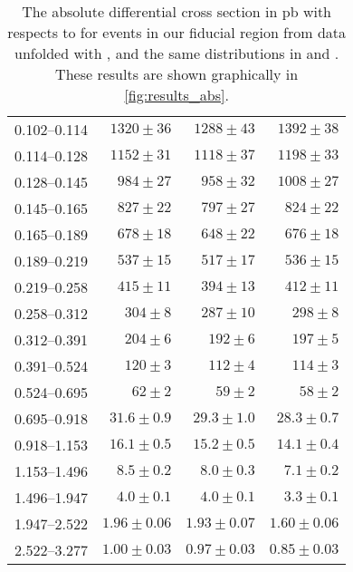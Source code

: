 \begin{table}
\begin{center}
\begin{tabular}{@{}l r r r@{}}
            0.102--0.114  &  $1320  \pm  36$    &  $1288  \pm  43$    &  $1392  \pm  38$    \\
            0.114--0.128  &  $1152  \pm  31$    &  $1118  \pm  37$    &  $1198  \pm  33$    \\
            0.128--0.145  &  $984   \pm  27$    &  $958   \pm  32$    &  $1008  \pm  27$    \\
            0.145--0.165  &  $827   \pm  22$    &  $797   \pm  27$    &  $824   \pm  22$    \\
            0.165--0.189  &  $678   \pm  18$    &  $648   \pm  22$    &  $676   \pm  18$    \\
            0.189--0.219  &  $537   \pm  15$    &  $517   \pm  17$    &  $536   \pm  15$    \\
            0.219--0.258  &  $415   \pm  11$    &  $394   \pm  13$    &  $412   \pm  11$    \\
            0.258--0.312  &  $304   \pm  8$     &  $287   \pm  10$    &  $298   \pm  8$     \\
            0.312--0.391  &  $204   \pm  6$     &  $192   \pm  6$     &  $197   \pm  5$     \\
            0.391--0.524  &  $120   \pm  3$     &  $112   \pm  4$     &  $114   \pm  3$     \\
            0.524--0.695  &  $62    \pm  2$     &  $59    \pm  2$     &  $58    \pm  2$     \\
            0.695--0.918  &  $31.6  \pm  0.9$   &  $29.3  \pm  1.0$   &  $28.3  \pm  0.7$   \\
            0.918--1.153  &  $16.1  \pm  0.5$   &  $15.2  \pm  0.5$   &  $14.1  \pm  0.4$   \\
            1.153--1.496  &  $8.5   \pm  0.2$   &  $8.0   \pm  0.3$   &  $7.1   \pm  0.2$   \\
            1.496--1.947  &  $4.0   \pm  0.1$   &  $4.0   \pm  0.1$   &  $3.3   \pm  0.1$   \\
            1.947--2.522  &  $1.96  \pm  0.06$  &  $1.93  \pm  0.07$  &  $1.60  \pm  0.06$  \\
            2.522--3.277  &  $1.00  \pm  0.03$  &  $0.97  \pm  0.03$  &  $0.85  \pm  0.03$  \\
            \bottomrule
        \end{tabular}
    \end{center}
    \caption[
        The absolute differential cross section in \si{\pico\barn} with
        respects to \phistar for \Ztoee events in our fiducial region from data
        unfolded with \MADGRAPH.
    ]{
        The absolute differential cross section in \si{\pico\barn} with
        respects to \phistar for \Ztoee events in our fiducial region from data
        unfolded with \MADGRAPH, and the same distributions in \MADGRAPH and
        \POWHEG. These results are shown graphically in \cref{fig:results_abs}.
    }
    \label{tab:results_abs}
\end{table}
